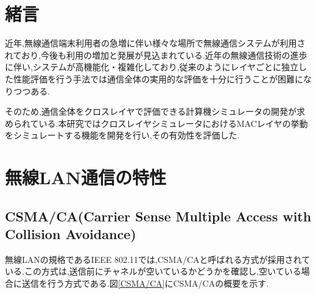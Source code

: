 \documentclass[a4paper, 10pt]{ltjsarticle}
\begin{document}
\setlength{\columnsep}{7.5mm}

\twocolumn[
    \begin{center}
        {\vspace{-1em}}

        {\fontsize{15pt}{15pt}\selectfont{クロスレイヤシミュレータにおける無線LAN評価モデルの検討}}

        {\vspace{1.3em}}

        {\fontsize{13pt}{13pt}\selectfont{A Study of a Wireless LAN Evaluation Model in a Cross-Layer Simulator}}
    \end{center}

    \vspace{0.1em}

    \begin{flushright}
      {\fontsize{11pt}{11pt}\selectfont{T5-16 \, 下沢亮太郎}}
      \\
      {\fontsize{11pt}{11pt}\selectfont{指導教員 \, 設樂勇}}
    \end{flushright}

    \vspace{1em}

    \thispagestyle{empty}
]

\section{緒言}
近年,無線通信端末利用者の急増に伴い様々な場所で無線通信システムが利用されており,今後も利用の増加と発展が見込まれている.近年の無線通信技術の進歩に伴い,システムが高機能化・複雑化しており,従来のようにレイヤごとに独立した性能評価を行う手法では通信全体の実用的な評価を十分に行うことが困難になりつつある.

そのため,通信全体をクロスレイヤで評価できる計算機シミュレータの開発が求められている.本研究ではクロスレイヤシミュレータにおけるMACレイヤの挙動をシミュレートする機能を開発を行い,その有効性を評価した.


\section{無線LAN通信の特性}
\subsection{CSMA/CA(Carrier Sense Multiple Access with Collision Avoidance)}
無線LANの規格であるIEEE 802.11では,CSMA/CAと呼ばれる方式が採用されている.この方式は,送信前にチャネルが空いているかどうかを確認し,空いている場合に送信を行う方式である.図\ref{CSMA/CA}にCSMA/CAの概要を示す.
\end{document}
